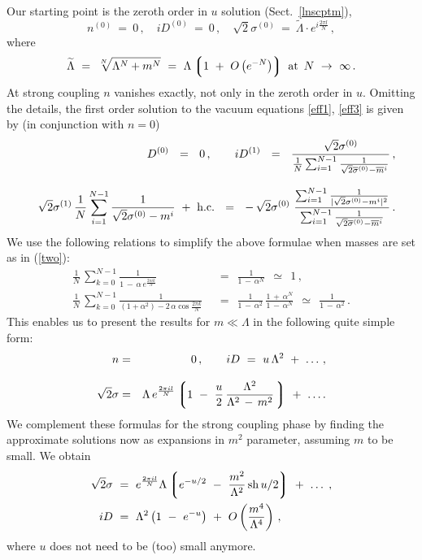 \documentclass[epsfig,12pt]{article}
\def\beq{\begin{equation}}
\def\eeq{\end{equation}}
\def\beqn{\begin{eqnarray}}
\def\eeqn{\end{eqnarray}}
\def\beqn{\begin{eqnarray}}
\def\eeqn{\end{eqnarray}}
\def\beq{\begin{equation}}
\def\eeq{\end{equation}}
\newcommand{\wt}{\widetilde}
\newcommand{\ov}{\overline}
\newcommand{\lgr}{\left\lgroup}
\newcommand{\rgr}{\right\rgroup}
\newcommand{\nz}{{n^{(0)}}}
\newcommand{\Dz}{{D^{(0)}}}
\newcommand{\Do}{{D^{(1)}}}
\newcommand{\sigz}{{\sigma^{(0)}}}
\newcommand{\sigo}{{\sigma^{(1)}}}
\newcommand{\bsigz}{{\ov{\sigma}{}^{(0)}}}
\begin{document}
{Our starting point is the zeroth order in $ u $ solution (Sect.~\ref{lnscptm}),
\beq
	\nz ~=~ 0\,, \quad
	i \Dz ~=~ 0\,, \quad
	\sqrt{2}\sigz ~=~ \wt{\Lambda}\cdot e^{i\frac{2\pi l}{N}}\,,  
	\label{zosol}
	\eeq
	where
\beq
	\wt{\Lambda} ~=~ \sqrt[N]{ \Lambda^N + m^N } ~=~ \Lambda\lgr 1 ~+~ O\left(e^{-N}\right) \rgr\,\, 
	{\rm at}\,\,\, N ~\to~ \infty\,.
	\label{tilla}
\eeq
	At strong coupling $n$ vanishes exactly, not only in the zeroth order in $u$.
Omitting the details, the first order solution to the vacuum equations \eqref{eff1}, \eqref{eff3} 
is given by (in conjunction with $n=0$)
\beqn
&&
 \Dz  ~~=~~ 0\,,\qquad
	i \Do ~~=~~ \frac{ \sqrt{2}\sigz } 
		    {\frac{1}{N} \sum_{i=1}^{N-1} 
		                 \frac{1}{ \sqrt{2}\bsigz - \ov{m}{}^i } } \,,
\label{strongeq}\\[3mm]
&&
	\sqrt{2}\sigo \, \frac{1}{N} \sum_{i=1}^{N-1} \frac{1}
			{ \sqrt{2}\sigz - m^i }
		~+~ \text{h.c.} ~~=~~
	-\, \sqrt{2}\sigz  \,\,
	\frac{ \sum_{i=1}^{N-1} 
			\frac{1}{ | \sqrt{2}\sigz - m^i |^2 } }
	  {  \sum_{i=1}^{N-1} \frac{1}{ \sqrt{2}\bsigz - \ov{m}{}^i } }\,.
\notag
\eeqn
We use the following relations to simplify the above formulae when masses are set as in (\ref{two}):
\begin{align}
	\frac{1}{N}\, \sum_{k=0}^{N-1} \frac{1} { 1 \,-\, \alpha\,e^{\frac{2\pi i k}{N}} } &~~=~~
		\frac{1}{1 \,-\, \alpha^N} ~~\simeq~~ 1\,,
	\nonumber\\[2mm]
	\frac{1}{N}\, \sum_{k=0}^{N-1} \frac{1} { (1 + \alpha^2) - 2\,\alpha \cos \frac{2 \pi k}{N} }
		&~~=~~
	\frac{1} {1 \,-\, \alpha^2} \, \frac{1 \,+\, \alpha^N}{ 1 \,-\, \alpha^N} 
		~~\simeq~~
	\frac{1} {1 \,-\, \alpha^2} \,.
	\label{vspfor}
\end{align}
	This enables us to present the results for $m\ll\Lambda$ in the following quite simple form:
\beqn
\label{finstr}
	n 
	&=&  0 \,,\qquad i D   ~=~  u\, \Lambda^2 ~+~ \ldots \,, 
	\nonumber\\[3mm]
	\sqrt{2}\sigma & =& \Lambda \, e^{\frac{2\pi i l}{N}} \lgr
			1 ~-~ \frac{u}{2}\, 
				\frac{\Lambda^2}{\Lambda^2 \,-\, m^2}\,\rgr ~+~ \ldots.
\eeqn
	We complement these formulas for the strong coupling phase by finding the approximate solutions
	now as expansions in $m^2$ parameter, assuming $m$ to be small.
	We obtain
\begin{align}
%
\notag
	\sqrt{2}\sigma & ~=~ e^{\frac{2\pi i l}{N}} \Lambda \lgr 
			   e^{-u/2} ~-~ \frac{m^2}{\Lambda^2}\, {\rm sh}\,u/2 \rgr ~+~ \ldots\;,
	\\
\label{smstr}
	iD & ~=~ \Lambda^2 \left( 1 ~-~ e^{-u} \right) ~+~ O\left(\frac{m^4}{\Lambda^4}\right)\, ,
%
\end{align}
	where $u$ does not need to be (too) small anymore.

}
\end{document}
